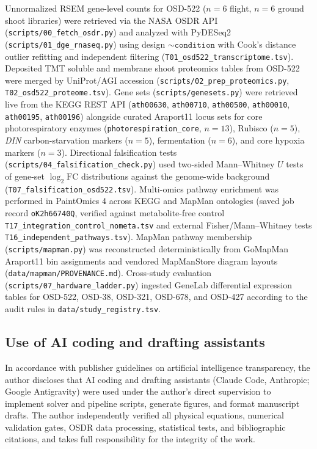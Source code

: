 \documentclass[final,5p,times,twocolumn,numbers,sort&compress]{elsarticle}
\begin{document}
Unnormalized RSEM gene-level counts for OSD-522 ($n=6$ flight, $n=6$ ground shoot libraries) were retrieved via the NASA OSDR API (\texttt{scripts/00\_fetch\_osdr.py}) and analyzed with PyDESeq2 \citep{pydeseq2} (\texttt{scripts/01\_dge\_rnaseq.py}) using design $\sim\texttt{condition}$ with Cook's distance outlier refitting and independent filtering (\texttt{T01\_osd522\_transcriptome.tsv}). Deposited TMT soluble and membrane shoot proteomics tables from OSD-522 were merged by UniProt/AGI accession (\texttt{scripts/02\_prep\_proteomics.py}, \texttt{T02\_osd522\_proteome.tsv}). Gene sets (\texttt{scripts/genesets.py}) were retrieved live from the KEGG REST API \citep{kanehisa2000,kegg} (\texttt{ath00630}, \texttt{ath00710}, \texttt{ath00500}, \texttt{ath00010}, \texttt{ath00195}, \texttt{ath00196}) alongside curated Araport11 locus sets for core photorespiratory enzymes (\texttt{photorespiration\_core}, $n=13$), Rubisco ($n=5$), \textit{DIN} carbon-starvation markers ($n=5$), fermentation ($n=6$), and core hypoxia markers ($n=3$). Directional falsification tests (\texttt{scripts/04\_falsification\_check.py}) used two-sided Mann--Whitney $U$ tests of gene-set $\log_2\mathrm{FC}$ distributions against the genome-wide background (\texttt{T07\_falsification\_osd522.tsv}). Multi-omics pathway enrichment was performed in PaintOmics 4 \citep{paintomics4} across KEGG and MapMan ontologies (saved job record \texttt{oK2h66740Q}, verified against metabolite-free control \texttt{T17\_integration\_control\_nometa.tsv} and external Fisher/Mann--Whitney tests \texttt{T16\_independent\_pathways.tsv}). MapMan pathway membership (\texttt{scripts/mapman.py}) was reconstructed deterministically from GoMapMan Araport11 bin assignments and vendored MapManStore diagram layouts (\texttt{data/mapman/PROVENANCE.md}). Cross-study evaluation (\texttt{scripts/07\_hardware\_ladder.py}) ingested GeneLab differential expression tables for OSD-522, OSD-38, OSD-321, OSD-678, and OSD-427 according to the audit rules in \texttt{data/study\_registry.tsv}.

\subsection{Use of AI coding and drafting assistants}

In accordance with publisher guidelines on artificial intelligence transparency, the author discloses that AI coding and drafting assistants (Claude Code, Anthropic; Google Antigravity) were used under the author's direct supervision to implement solver and pipeline scripts, generate figures, and format manuscript drafts. The author independently verified all physical equations, numerical validation gates, OSDR data processing, statistical tests, and bibliographic citations, and takes full responsibility for the integrity of the work.
\end{document}
